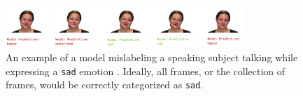 \begin{figure}
    \centering
    \includegraphics[width=0.8\textwidth]{res/modelex.png}
    \caption{An example of a model mislabeling a speaking subject talking while expressing a \texttt{sad} emotion \cite{livingstone2018ryerson}. Ideally, all frames, or the collection of frames, would be correctly categorized as \texttt{sad}.}
    \label{fig:mislabel}
\end{figure}